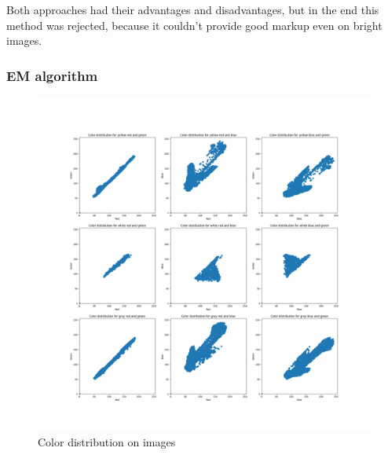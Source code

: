 Both approaches had their advantages and disadvantages, but in the end this method
was rejected, because it couldn't provide good markup even on 
bright images.

\subsubsection{EM algorithm}
\begin{figure}[h]
    \begin{center}
        \includegraphics[scale=0.232]{src/BackgroundReading/assets/Distr.png}
    \end{center}
    \caption{Color distribution on images}
\end{figure}

